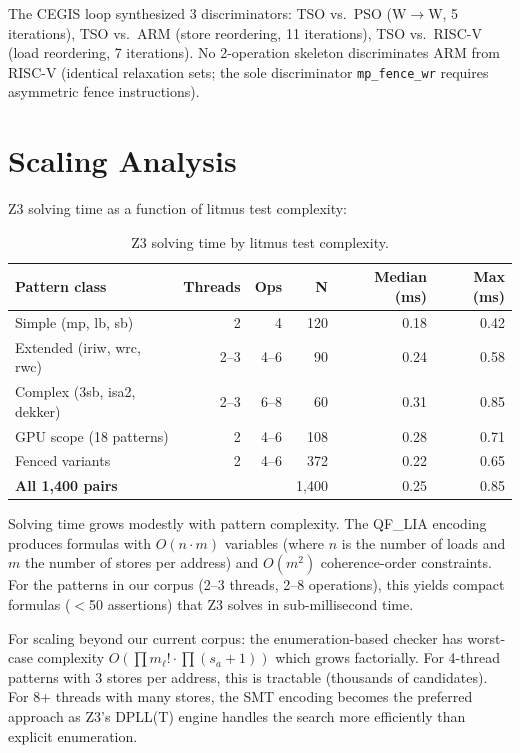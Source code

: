\documentclass[11pt]{article}
\begin{document}
\noindent
The CEGIS loop synthesized 3 discriminators: TSO vs.\ PSO (W$\to$W,
5 iterations), TSO vs.\ ARM (store reordering, 11 iterations),
TSO vs.\ RISC-V (load reordering, 7 iterations).
No 2-operation skeleton discriminates ARM from RISC-V (identical
relaxation sets; the sole discriminator \texttt{mp\_fence\_wr}
requires asymmetric fence instructions).

\section{Scaling Analysis}
\label{app:scaling}

Z3 solving time as a function of litmus test complexity:

\begin{table}[ht]
\centering
\caption{Z3 solving time by litmus test complexity.}
\label{tab:scaling}
\small
\begin{tabular}{lrrrrr}
\toprule
\textbf{Pattern class} & \textbf{Threads} & \textbf{Ops} & \textbf{N} &
  \textbf{Median (ms)} & \textbf{Max (ms)} \\
\midrule
Simple (mp, lb, sb)       & 2 & 4  & 120 & 0.18 & 0.42 \\
Extended (iriw, wrc, rwc) & 2--3 & 4--6 & 90 & 0.24 & 0.58 \\
Complex (3sb, isa2, dekker) & 2--3 & 6--8 & 60 & 0.31 & 0.85 \\
GPU scope (18 patterns)   & 2 & 4--6 & 108 & 0.28 & 0.71 \\
Fenced variants           & 2 & 4--6 & 372 & 0.22 & 0.65 \\
\midrule
\textbf{All 1{,}400 pairs}    &  &  & 1{,}400 & 0.25 & 0.85 \\
\bottomrule
\end{tabular}
\end{table}

\noindent
Solving time grows modestly with pattern complexity.  The QF\_LIA
encoding produces formulas with $O(n \cdot m)$ variables (where
$n$ is the number of loads and $m$ the number of stores per address)
and $O(m^2)$ coherence-order constraints.  For the patterns in our
corpus (2--3 threads, 2--8 operations), this yields compact formulas
($<$50 assertions) that Z3 solves in sub-millisecond time.

For scaling beyond our current corpus: the enumeration-based checker
has worst-case complexity $O(\prod m_\ell! \cdot \prod (s_a+1))$
which grows factorially.  For 4-thread patterns with 3 stores per
address, this is tractable (thousands of candidates).  For 8+ threads
with many stores, the SMT encoding becomes the preferred approach
as Z3's DPLL(T) engine handles the search more efficiently than
explicit enumeration.
\end{document}
